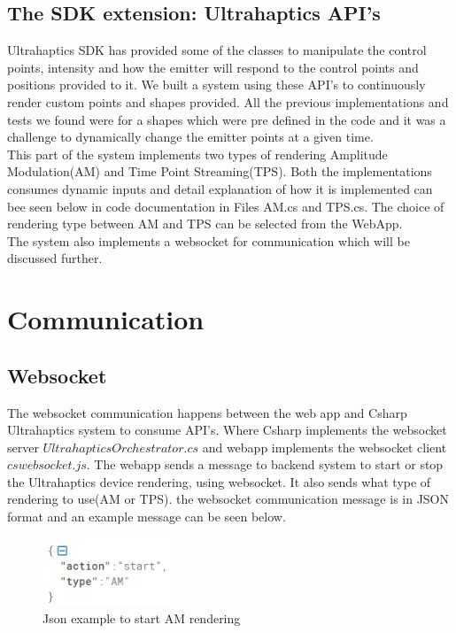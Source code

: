 \subsection*{The SDK extension: Ultrahaptics API's} 
Ultrahaptics SDK\cite{Ultrahaptics-APIs} has provided some of the classes to manipulate the control points, 
intensity and how the emitter will respond to the control points and positions provided to it. We built a 
system using these API's to continuously render custom points and shapes provided. 
All the previous implementations and tests we found were for a shapes which were pre defined in the code 
and it was a challenge to dynamically change the emitter points at a given time.  \\
This part of the system implements two types of rendering Amplitude Modulation(AM) and Time Point Streaming(TPS).
Both the implementations consumes dynamic inputs and detail explanation of how it is implemented 
can bee seen below in code documentation in Files AM.cs and TPS.cs. The choice of rendering type 
between AM and TPS can be selected from the WebApp. \\
The system also implements a websocket for communication which will be discussed further. 

\section{Communication}
\subsection*{Websocket}
The websocket communication happens between the web app and Csharp Ultrahaptics system to consume API's.
Where Csharp implements the websocket server $UltrahapticsOrchestrator.cs$ and webapp implements the 
websocket client $cswebsocket.js$. The webapp sends a message to backend system to start or stop the
Ultrahaptics device rendering, using websocket. It also sends what type of rendering to use(AM or TPS). the websocket 
communication message is in JSON format and an example message can be seen below.
\begin{figure}[htb]
	\includegraphics[width=40mm]{gfx/jsonstart.jpeg}
	\caption{Json example to start AM rendering}
	\label{fig:architecture:json}
\end{figure}

